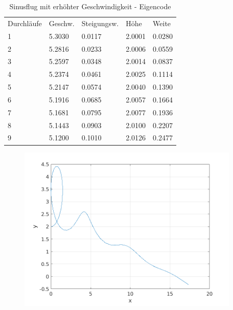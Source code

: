 \documentclass[a4paper,12pt]{scrartcl}
\begin{document}
\begin{table}
\centering
\caption{Sinusflug mit erhöhter Geschwindigkeit - Eigencode}
\begin{tabular}{lllll}
Durchläufe & Geschw. & Steigungsw. & Höhe   & Weite    \\
1          & 5.3030  & 0.0117      & 2.0001 & 0.0280   \\
2          & 5.2816  & 0.0233      & 2.0006 & 0.0559   \\
3          & 5.2597  & 0.0348      & 2.0014 & 0.0837  \\
4          & 5.2374  & 0.0461      & 2.0025 & 0.1114   \\
5          & 5.2147  & 0.0574      & 2.0040 & 0.1390   \\
6          & 5.1916  & 0.0685      & 2.0057 & 0.1664   \\
7          & 5.1681  & 0.0795      & 2.0077 & 0.1936   \\
8          & 5.1443  & 0.0903      & 2.0100 & 0.2207   \\
9          & 5.1200  & 0.1010      & 2.0126 & 0.2477  
\end{tabular}
\end{table}
\begin{figure}[htp]
	\centering
	\includegraphics[width=300pt]{flightpath4.png}
	\label{fig:sin3}
\end{figure}
\end{document}
